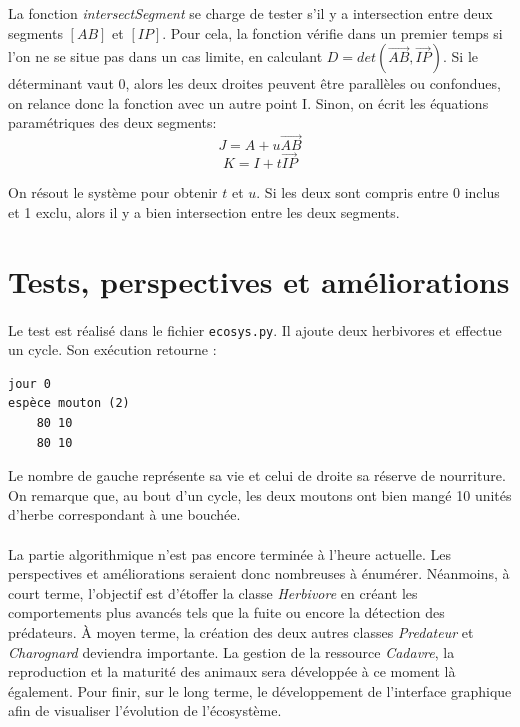 \documentclass[a4paper,11pt,final,oneside]{article}
\begin{document}
La fonction \textit{intersectSegment} se charge de tester s'il y a intersection entre deux segments $[AB]$ et $[IP]$. Pour cela, la fonction vérifie dans un premier temps si l'on ne se situe pas dans un cas limite, en calculant $D = det(\overrightarrow{AB}, \overrightarrow{IP})$. Si le déterminant vaut 0, alors les deux droites peuvent être parallèles ou confondues, on relance donc la fonction avec un autre point I. Sinon, on écrit les équations paramétriques des deux segments:
\[J = A + u\overrightarrow{AB}\]
\[K = I + t\overrightarrow{IP}\]

On résout le système pour obtenir $t$ et $u$. Si les deux sont compris entre 0 inclus et 1 exclu, alors il y a bien intersection entre les deux segments.

		
	\section{Tests, perspectives et améliorations}
	\label{sec:tes}
	
\paragraph{} Le test est réalisé dans le fichier \texttt{ecosys.py}. Il ajoute deux herbivores et effectue un cycle. Son exécution retourne :

\begin{lstlisting}
jour 0
espèce mouton (2)
	80 10
	80 10
\end{lstlisting}

Le nombre de gauche représente sa vie et celui de droite sa réserve de nourriture. On remarque que, au bout d'un cycle, les deux moutons ont bien mangé 10 unités d'herbe correspondant à une bouchée.

\paragraph{} La partie algorithmique n'est pas encore terminée à l'heure actuelle. Les perspectives et améliorations seraient donc nombreuses à énumérer. Néanmoins, à court terme, l'objectif est d'étoffer la classe \textit{Herbivore} en créant les comportements plus avancés tels que la fuite ou encore la détection des prédateurs. À moyen terme, la création des deux autres classes \textit{Predateur} et \textit{Charognard} deviendra importante. La gestion de la ressource \textit{Cadavre}, la reproduction et la maturité des animaux sera développée à ce moment là également. Pour finir, sur le long terme, le développement de l'interface graphique afin de visualiser l'évolution de l'écosystème.
\end{document}
